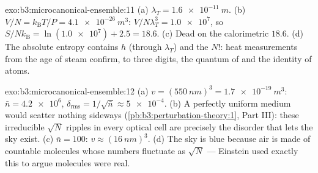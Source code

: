 \begin{solution}{exo:b3:microcanonical-ensemble:11}
(a) $\lambda_T = \qty{1.6e-11}{m}$. (b) $V/N = k_{\text{B}}T/P =
\qty{4.1e-26}{m^3}$: $V/N\lambda_T^3 = \num{1.0e7}$, so
$S/Nk_{\text{B}} = \ln(\num{1.0e7}) + 2.5 = 18.6$. (c) Dead on
the calorimetric $18.6$. (d) The absolute entropy contains $h$
(through $\lambda_T$) and the $N!$: heat measurements from the
age of steam confirm, to three digits, the quantum of  and
the identity of atoms.
\end{solution}

\begin{solution}{exo:b3:microcanonical-ensemble:12}
(a) $v = (\qty{550}{nm})^3 = \qty{1.7e-19}{m^3}$: $\bar n =
\num{4.2e6}$, $\delta_{\text{rms}} = 1/\sqrt{\bar n} \approx
\num{5e-4}$. (b) A perfectly uniform medium would scatter nothing
sideways (\cref{pb:b3:perturbation-theory:1}, Part III): these
irreducible $\sqrt N$ ripples in every optical cell are precisely
the disorder that lets the sky exist. (c) $\bar n = 100$: $v
\approx (\qty{16}{nm})^3$. (d) The sky is blue because air is made
of countable molecules whose numbers fluctuate as $\sqrt N$ ---
Einstein used exactly this to argue molecules were real.
\end{solution}

